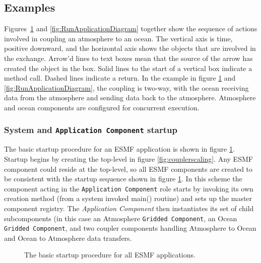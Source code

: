 \subsection{Examples}

Figures~\ref{fig:ESMFApplicationMain} and \ref{fig:RunApplicationDiagram} together show the 
sequence of actions involved
in coupling an atmosphere to an ocean.  The vertical axis is time, positive
downward, and the horizontal axis shows the objects that are involved in the
exchange.  Arrow'd lines to text boxes mean that the source of the arrow has 
created the object in the box.  Solid lines to the start of a vertical
box indicate a method call.  Dashed lines indicate a return.  
In the example in figure \ref{fig:ESMFApplicationMain} and \ref{fig:RunApplicationDiagram}, the 
coupling is two-way, with the ocean 
receiving data from the atmosphere and sending data back to the atmosphere.  Atmosphere
and ocean components are configured for concurrent execution.

\subsubsection{System and {\tt Application Component} startup}

The basic startup procedure for an ESMF application is shown in figure \ref{fig:ESMFApplicationMain}. Startup
begins by creating the top-level in figure \ref{fig:couplerscaling}. Any ESMF component could reside at the top-level, so
all ESMF components are created to be consistent with the startup sequence shown in figure \ref{fig:ESMFApplicationMain}.
In this scheme the component acting in the {\tt Application Component} role starts by invoking its
own creation method (from a system invoked main() routine) and sets up the master component registry.
The {\it Application Component} then instantiates its set of child subcomponents (in this case an Atmosphere {\tt Gridded
Component}, an Ocean {\tt Gridded Component}, and two coupler components handling Atmosphere to Ocean and Ocean 
to Atmosphere data transfers.

\begin{figure}
\caption[{ESMF Boot Up Stage}]{The basic startup procedure for
all ESMF applications.}
\label{fig:ESMFApplicationMain}
\end{figure}

